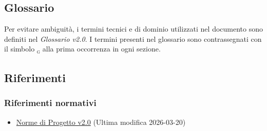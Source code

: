 \documentclass[a4paper, 11pt, oneside]{scrartcl}
\begin{document}
\subsection{Glossario}
Per evitare ambiguit\`a, i termini tecnici e di dominio utilizzati nel documento sono definiti nel \textit{Glossario v2.0}.
I termini presenti nel glossario sono contrassegnati con il simbolo \textsubscript{\textsc{g}} alla prima occorrenza in ogni sezione.

\subsection{Riferimenti}

\subsubsection{Riferimenti normativi}
\begin{itemize}
    \item \href{https://swenightpro.github.io/Documentazione/docs/RTB/Documentazione%20Interna/Norme_di_Progetto_v2.0.pdf}{Norme di Progetto v2.0} (Ultima modifica 2026-03-20)
\end{itemize}
\end{document}
